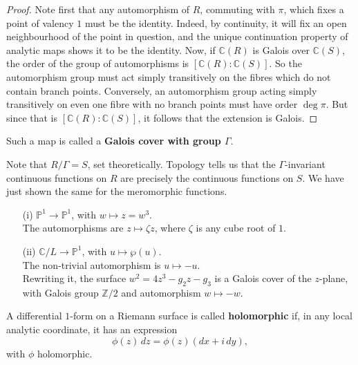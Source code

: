 \documentclass[12pt]{article}
\begin{document}
\begin{proof}
Note first that any automorphism of $R$, commuting with $\pi$, which fixes a point of valency $1$ must be the identity.  
Indeed, by continuity, it will fix an open neighbourhood of the point in question, and the unique continuation property of analytic maps shows it to be the identity.  
Now, if $\mathbb{C}(R)$ is Galois over $\mathbb{C}(S)$, the order of the group of automorphisms is $[\mathbb{C}(R):\mathbb{C}(S)]$.  
So the automorphism group must act simply transitively on the fibres which do not contain branch points.  
Conversely, an automorphism group acting simply transitively on even one fibre with no branch points must have order $\deg \pi$.  
But since that is $[\mathbb{C}(R):\mathbb{C}(S)]$, it follows that the extension is Galois.
\end{proof}
Such a map is called a \textbf{Galois cover with group $\Gamma$}.

\begin{remark}
Note that $R/\Gamma = S$, set theoretically.  
Topology tells us that the $\Gamma$-invariant continuous functions on $R$ are precisely the continuous functions on $S$.  
We have just shown the same for the meromorphic functions.
\end{remark}

\begin{example}
    \leavevmode
\begin{enumerate}
    \item[(i)] $\mathbb{P}^1 \longrightarrow \mathbb{P}^1$, with $w \longmapsto z = w^3$.\\[4pt]
    The automorphisms are $z \mapsto \zeta z$, where $\zeta$ is any cube root of $1$.

    \item[(ii)] $\mathbb{C}/L \longrightarrow \mathbb{P}^1$, with $u \longmapsto \wp(u)$.\\[4pt]
    The non-trivial automorphism is $u \longmapsto -u$.\\[4pt]
    Rewriting it, the surface $w^2 = 4z^3 - g_2 z - g_3$ is a Galois cover of the $z$-plane, with Galois group $\mathbb{Z}/2$ and automorphism $w \mapsto -w$.
\end{enumerate}
\end{example}

\begin{definition}
A differential $1$-form on a Riemann surface is called \textbf{holomorphic} if, in any local analytic coordinate, it has an expression
\[
\phi(z)\,dz = \phi(z)(dx + i\,dy),
\]
with $\phi$ holomorphic.
\end{definition}
\end{document}
